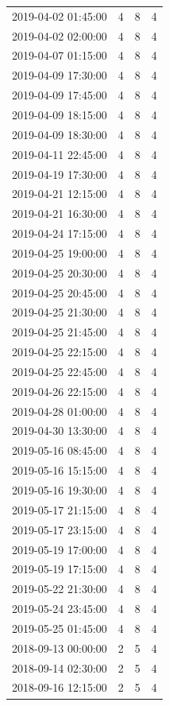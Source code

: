 \begin{tabular}{lrrr}
2019-04-02 01:45:00 & 4 & 8 & 4 \\
2019-04-02 02:00:00 & 4 & 8 & 4 \\
2019-04-07 01:15:00 & 4 & 8 & 4 \\
2019-04-09 17:30:00 & 4 & 8 & 4 \\
2019-04-09 17:45:00 & 4 & 8 & 4 \\
2019-04-09 18:15:00 & 4 & 8 & 4 \\
2019-04-09 18:30:00 & 4 & 8 & 4 \\
2019-04-11 22:45:00 & 4 & 8 & 4 \\
2019-04-19 17:30:00 & 4 & 8 & 4 \\
2019-04-21 12:15:00 & 4 & 8 & 4 \\
2019-04-21 16:30:00 & 4 & 8 & 4 \\
2019-04-24 17:15:00 & 4 & 8 & 4 \\
2019-04-25 19:00:00 & 4 & 8 & 4 \\
2019-04-25 20:30:00 & 4 & 8 & 4 \\
2019-04-25 20:45:00 & 4 & 8 & 4 \\
2019-04-25 21:30:00 & 4 & 8 & 4 \\
2019-04-25 21:45:00 & 4 & 8 & 4 \\
2019-04-25 22:15:00 & 4 & 8 & 4 \\
2019-04-25 22:45:00 & 4 & 8 & 4 \\
2019-04-26 22:15:00 & 4 & 8 & 4 \\
2019-04-28 01:00:00 & 4 & 8 & 4 \\
2019-04-30 13:30:00 & 4 & 8 & 4 \\
2019-05-16 08:45:00 & 4 & 8 & 4 \\
2019-05-16 15:15:00 & 4 & 8 & 4 \\
2019-05-16 19:30:00 & 4 & 8 & 4 \\
2019-05-17 21:15:00 & 4 & 8 & 4 \\
2019-05-17 23:15:00 & 4 & 8 & 4 \\
2019-05-19 17:00:00 & 4 & 8 & 4 \\
2019-05-19 17:15:00 & 4 & 8 & 4 \\
2019-05-22 21:30:00 & 4 & 8 & 4 \\
2019-05-24 23:45:00 & 4 & 8 & 4 \\
2019-05-25 01:45:00 & 4 & 8 & 4 \\
2018-09-13 00:00:00 & 2 & 5 & 4 \\
2018-09-14 02:30:00 & 2 & 5 & 4 \\
2018-09-16 12:15:00 & 2 & 5 & 4 \\

\end{tabular}
